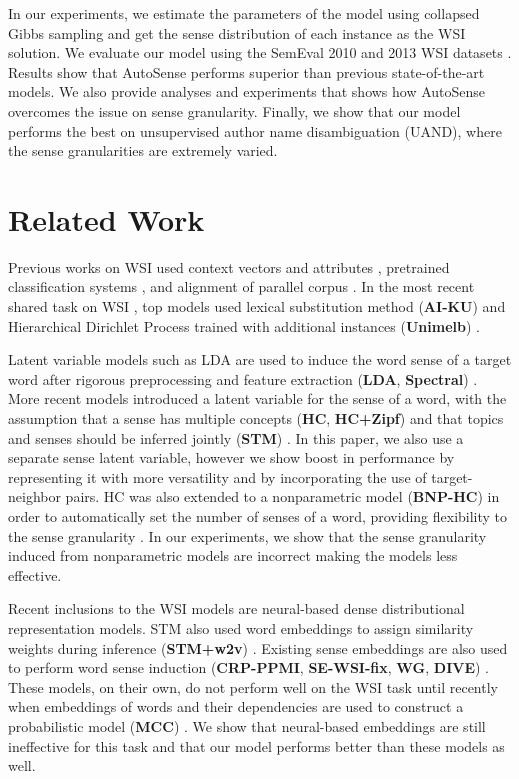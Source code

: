 \documentclass[letterpaper]{article} %
\begin{document}
In our experiments, we estimate the parameters of the model using collapsed Gibbs sampling and get the sense distribution of each instance as the WSI solution. We evaluate our model using the SemEval 2010 and 2013 WSI datasets \cite{manandhar2010semeval,jurgens2013semeval}. Results show that AutoSense performs superior than previous state-of-the-art models. We also provide analyses and experiments that shows how AutoSense overcomes the issue on sense granularity. Finally, we show that our model performs the best on unsupervised author name disambiguation (UAND), where the sense granularities are extremely varied.

\section{Related Work}

Previous works on WSI used context vectors and attributes \cite{almuhareb2006msda}, pretrained classification systems \cite{tsvetkov2014augmenting}, and alignment of parallel corpus \cite{yao2012expectations}. In the most recent shared task on WSI \cite{jurgens2013semeval}, top models used lexical substitution method (\textbf{AI-KU}) \cite{baskaya2013ai} and Hierarchical Dirichlet Process trained with additional instances (\textbf{Unimelb}) \cite{lau2013unimelb}.

Latent variable models such as LDA \cite{blei2003latent} are used to induce the word sense of a target word after rigorous preprocessing and feature extraction (\textbf{LDA}, \textbf{Spectral}) \cite{goyal2014unsupervised}.  More recent models introduced a latent variable for the sense of a word, with the assumption that a sense has multiple concepts (\textbf{HC}, \textbf{HC+Zipf}) \cite{chang2014inducing} and that topics and senses should be inferred jointly (\textbf{STM}) \cite{wang2015sense}. In this paper, we also use a separate sense latent variable, however we show boost in performance by representing it with more versatility and by incorporating the use of target-neighbor pairs. HC was also extended to a nonparametric model (\textbf{BNP-HC}) \cite{teh2004sharing} in order to automatically set the number of senses of a word, providing flexibility to the sense granularity \cite{yao2011nonparametric,lau2012word,lau2013unimelb}. In our experiments, we show that the sense granularity induced from nonparametric models are incorrect making the models less effective.

Recent inclusions to the WSI models are neural-based dense distributional representation models. STM also used word embeddings \cite{mikolov2013distributed} to assign similarity weights during inference (\textbf{STM+w2v}) \cite{wang2015sense}. Existing sense embeddings are also used to perform word sense induction (\textbf{CRP-PPMI}, \textbf{SE-WSI-fix}, \textbf{WG}, \textbf{DIVE}) \cite{song2016word,pelevina2016making,chang2018efficient}. These models, on their own, do not perform well on the WSI task until recently when embeddings of words and their dependencies are used to construct a probabilistic model (\textbf{MCC}) \cite{komninos2016structured}. We show that neural-based embeddings are still ineffective for this task and that our model performs better than these models as well.
\end{document}
